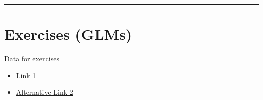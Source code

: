 \documentclass[
]{book}
\providecommand{\tightlist}{%
  \setlength{\itemsep}{0pt}\setlength{\parskip}{0pt}}
\theoremstyle{definition}
\theoremstyle{definition}
\theoremstyle{definition}
\theoremstyle{remark}
\begin{document}
\begin{center}\rule{0.5\linewidth}{0.5pt}\end{center}

\hypertarget{exercises-glms}{%
\section{Exercises (GLMs)}\label{exercises-glms}}

Data for exercises

\begin{itemize}
\tightlist
\item
  \href{https://github.com/olgadet/bookdown-mlbiostatistics/tree/master/data/lm/data.zip}{Link 1}
\item
  \href{https://stockholmuniversity.box.com/s/z5kwg0nlwe5la4h5t8bshpj57pylif14}{Alternative Link 2}
\end{itemize}
\end{document}
